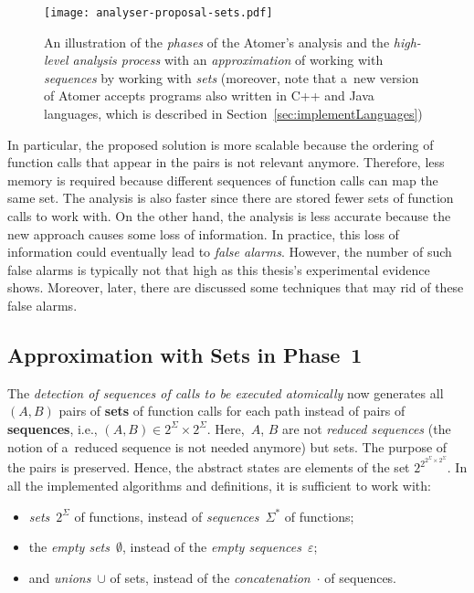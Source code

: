 \begin{figure}[hbt]
    \centering
    \texttt{[image: analyser-proposal-sets.pdf]}
    \caption{An illustration of the \emph{phases} of the Atomer's analysis and the \emph{high-level analysis process} with an \emph{approximation} of working with \emph{sequences} by working with \emph{sets} (moreover, note that a~new version of Atomer accepts programs also written in C++ and Java languages, which is described in Section~\ref{sec:implementLanguages})}
    \label{fig:atomerPhasesSets}
\end{figure}

In particular, the proposed solution is more scalable because the ordering of function calls that appear in the pairs is not relevant anymore. Therefore, less memory is required because different sequences of function calls can map the same set. The analysis is also faster since there are stored fewer sets of function calls to work with. On the other hand, the analysis is less accurate because the new approach causes some loss of information. In practice, this loss of information could eventually lead to \emph{false alarms}. However, the number of such false alarms is typically not that high as this thesis's experimental evidence shows. Moreover, later, there are discussed some techniques that may rid of these false alarms.

\subsection{Approximation with Sets in Phase~1}

The \emph{detection of sequences of calls to be executed atomically} now generates all $ (A, B) $ pairs of \textbf{sets} of function calls for each path instead of pairs of \textbf{sequences}, i.e., $ (A, B) \in 2^\Sigma \times 2^\Sigma $. Here,~$ A $, $ B $ are not \emph{reduced sequences} (the notion of a~reduced sequence is not needed anymore) but sets. The purpose of the pairs is preserved. Hence, the abstract states are elements of the set $ 2^{2^{2^\Sigma \times 2^\Sigma}} $. In all the implemented algorithms and definitions, it is sufficient to work with:
\begin{itemize}
    \item \emph{sets}~$ 2^\Sigma $ of functions, instead of \emph{sequences}~$ \Sigma^* $ of functions;

    \item the \emph{empty sets}~$ \emptyset $, instead of the \emph{empty sequences}~$ \varepsilon $;

    \item and \emph{unions}~$ \cup $ of sets, instead of the \emph{concatenation}~$ \cdot $ of sequences.
\end{itemize}

